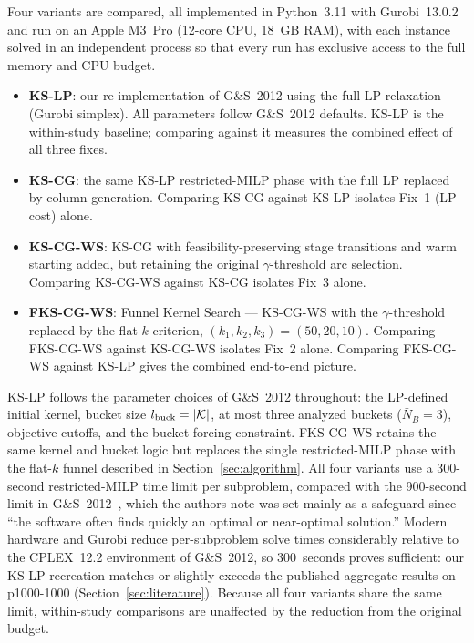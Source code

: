 Four variants are compared, all implemented in Python~3.11 with Gurobi~13.0.2
and run on an Apple M3~Pro (12-core CPU, 18~GB RAM), with each instance solved
in an independent process so that every run has exclusive access to the full
memory and CPU budget.
\begin{itemize}
  \item \textbf{KS-LP}: our re-implementation of G\&S~2012 using the full LP
        relaxation (Gurobi simplex).
        All parameters follow G\&S~2012 defaults.
        KS-LP is the within-study baseline; comparing against it measures
        the combined effect of all three fixes.
  \item \textbf{KS-CG}: the same KS-LP restricted-MILP phase with the full LP
        replaced by column generation.
        Comparing KS-CG against KS-LP isolates Fix~1 (LP cost) alone.
  \item \textbf{KS-CG-WS}: KS-CG with feasibility-preserving stage transitions
        and warm starting added, but retaining the original $\gamma$-threshold
        arc selection.
        Comparing KS-CG-WS against KS-CG isolates Fix~3 alone.
  \item \textbf{FKS-CG-WS}: Funnel Kernel Search --- KS-CG-WS with the
        $\gamma$-threshold replaced by the flat-$k$ criterion,
        $(k_1, k_2, k_3) = (50, 20, 10)$.
        Comparing FKS-CG-WS against KS-CG-WS isolates Fix~2 alone.
        Comparing FKS-CG-WS against KS-LP gives the combined end-to-end picture.
\end{itemize}

KS-LP follows the parameter choices of G\&S~2012 throughout: the LP-defined
initial kernel, bucket size $l_{\text{buck}} = |\mathcal{K}|$, at most three analyzed
buckets ($\bar{N}_B = 3$), objective cutoffs, and the bucket-forcing constraint.
FKS-CG-WS retains the same kernel and bucket logic but replaces the
single restricted-MILP phase with the flat-$k$ funnel described in
Section~\ref{sec:algorithm}.
All four variants use a 300-second restricted-MILP time limit per subproblem,
compared with the 900-second limit in G\&S~2012~\citep{guastaroba2012kernel},
which the authors note was set mainly as a safeguard since ``the software often
finds quickly an optimal or near-optimal solution.''
Modern hardware and Gurobi reduce per-subproblem solve times considerably
relative to the CPLEX~12.2 environment of G\&S~2012, so 300~seconds proves
sufficient: our KS-LP recreation matches or slightly exceeds the published
aggregate results on p1000-1000 (Section~\ref{sec:literature}).
Because all four variants share the same limit, within-study comparisons are
unaffected by the reduction from the original budget.

